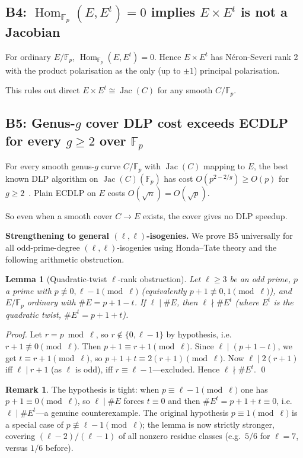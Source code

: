 \documentclass[11pt,a4paper]{article}
\newtheorem{lemma}[theorem]{Lemma}
\theoremstyle{definition}
\newtheorem{remark}[theorem]{Remark}
\newcommand{\FF}{\mathbb{F}}
\newcommand{\Hom}{\operatorname{Hom}}
\newcommand{\Jac}{\operatorname{Jac}}
\begin{document}
\subsection*{B4: $\Hom_{\FF_p}(E, E^t) = 0$ implies $E \times E^t$
is not a Jacobian}

For ordinary $E/\FF_p$, $\Hom_{\FF_p}(E, E^t) = 0$. Hence
$E \times E^t$ has Néron-Severi rank 2 with the product
polarisation as the only (up to $\pm 1$) principal polarisation.

This rules out direct $E \times E^t \cong \Jac(C)$ for any smooth
$C/\FF_p$.

\subsection*{B5: Genus-$g$ cover DLP cost exceeds ECDLP for every
$g \geq 2$ over $\FF_p$}

For every smooth genus-$g$ curve $C/\FF_p$ with $\Jac(C)$ mapping
to $E$, the best known DLP algorithm on $\Jac(C)(\FF_p)$ has cost
$O(p^{2 - 2/g}) \geq O(p)$ for $g \geq 2$~\cite{gaudry2000}. Plain
ECDLP on $E$ costs $O(\sqrt{n}) = O(\sqrt{p})$.

So even when a smooth cover $C \to E$ exists, the cover gives no
DLP speedup.

\medskip\noindent\textbf{Strengthening to general $(\ell,\ell)$-isogenies.}
We prove B5 universally for all odd-prime-degree $(\ell,\ell)$-isogenies
using Honda--Tate theory and the following arithmetic obstruction.

\begin{lemma}[Quadratic-twist $\ell$-rank obstruction]\label{lem:ell-rank}
Let $\ell \geq 3$ be an odd prime, $p$ a prime with
$p \not\equiv 0, \ell{-}1 \pmod{\ell}$ (equivalently $p+1 \not\equiv 0,1 \pmod{\ell}$),
and $E/\FF_p$ ordinary with $\#E = p+1-t$.  If $\ell \mid \#E$, then
$\ell \nmid \#E^t$ (where $E^t$ is the quadratic twist,
$\#E^t = p+1+t$).
\end{lemma}

\begin{proof}
Let $r = p \bmod \ell$, so $r \notin \{0, \ell{-}1\}$ by hypothesis,
i.e.\ $r+1 \not\equiv 0 \pmod{\ell}$.
Then $p+1 \equiv r+1 \pmod{\ell}$.  Since $\ell \mid (p+1-t)$,
we get $t \equiv r+1 \pmod{\ell}$, so
$p+1+t \equiv 2(r+1) \pmod{\ell}$.
Now $\ell \mid 2(r+1)$ iff $\ell \mid r+1$ (as $\ell$ is odd),
iff $r \equiv \ell{-}1$---excluded.  Hence $\ell \nmid \#E^t$. \qed
\end{proof}

\begin{remark}
The hypothesis is tight: when $p \equiv \ell{-}1 \pmod{\ell}$ one has
$p+1 \equiv 0 \pmod\ell$, so $\ell \mid \#E$ forces $t \equiv 0$
and then $\#E^t = p+1+t \equiv 0$, i.e.\ $\ell \mid \#E^t$---a
genuine counterexample.  The original hypothesis $p \equiv 1 \pmod\ell$
is a special case of $p \not\equiv \ell{-}1 \pmod\ell$; the lemma
is now strictly stronger, covering
$(\ell{-}2)/(\ell{-}1)$ of all nonzero residue classes
(e.g.\ $5/6$ for $\ell=7$, versus $1/6$ before).
\end{remark}
\end{document}
